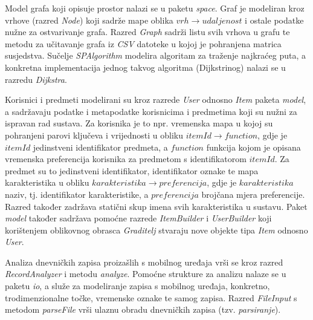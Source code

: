 \documentclass[times, utf8, diplomski, numeric]{fer}
\begin{document}
Model grafa koji opisuje prostor nalazi se u paketu \emph{space}. Graf je
modeliran kroz vrhove (razred \emph{Node}) koji sadrže mape oblika
$vrh \rightarrow udaljenost$ i ostale podatke nužne za ostvarivanje grafa.
Razred \emph{Graph} sadrži listu svih vrhova u grafu te metodu za učitavanje
grafa iz \emph{CSV} datoteke u kojoj je pohranjena matrica susjedstva. Sučelje
\emph{SPAlgorithm} modelira algoritam za traženje najkraćeg puta, a konkretna
implementacija jednog takvog algoritma (Dijkstrinog) nalazi se u razredu
\emph{Dijkstra}.

Korisnici i predmeti modelirani su kroz razrede \emph{User} odnosno \emph{Item}
paketa \emph{model}, a sadržavaju podatke i metapodatke korisnicima i predmetima
koji su nužni za ispravan rad sustava. Za korisnika je to npr. vremenska mapa u
kojoj su pohranjeni parovi ključeva i vrijednosti u obliku
$itemId \rightarrow function$, gdje je $itemId$ jedinstveni identifikator
predmeta, a $function$ funkcija kojom je opisana vremenska preferencija
korisnika za predmetom s identifikatorom $itemId$. Za predmet su to jedinstveni
identifikator, identifikator oznake te mapa karakteristika u obliku
$karakteristika \rightarrow preferencija$, gdje je $karakteristika$ naziv, tj.
identifikator karakteristike, a $preferencija$ brojčana mjera preferencije.
Razred također zadržava statični skup imena svih karakteristika u sustavu.
Paket \emph{model} također sadržava pomoćne razrede \emph{ItemBuilder} i
\emph{UserBuilder} koji korištenjem oblikovnog obrasca \emph{Graditelj} stvaraju
nove objekte tipa \emph{Item} odnosno \emph{User}.
 
Analiza dnevničkih zapisa proizašlih s mobilnog uređaja vrši se kroz razred
\emph{RecordAnalyzer} i metodu \emph{analyze}. Pomoćne strukture za analizu
nalaze se u paketu \emph{io}, a služe za modeliranje zapisa s mobilnog uređaja,
konkretno, trodimenzionalne točke, vremenske oznake te samog zapisa. Razred
\emph{FileInput} s metodom \emph{parseFile} vrši ulaznu obradu dnevničkih
zapisa (tzv. \emph{parsiranje}).
\end{document}
